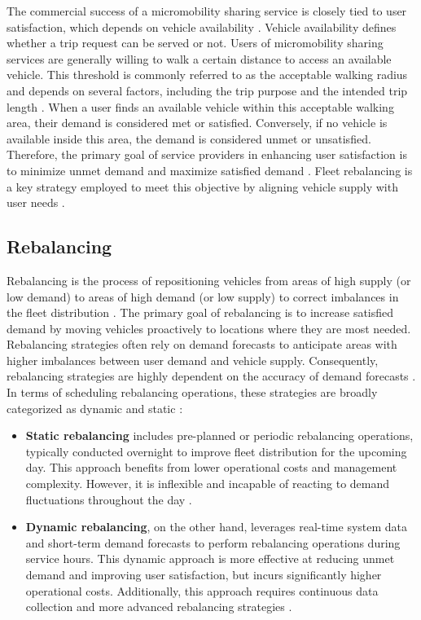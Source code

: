 The commercial success of a micromobility sharing service is closely tied to user satisfaction, which depends on vehicle availability \cite{wu_challenges_2020}.
Vehicle availability defines whether a trip request can be served or not.
Users of micromobility sharing services are generally willing to walk a certain distance to access an available vehicle.
This threshold is commonly referred to as the acceptable walking radius and depends on several factors, including the trip purpose and the intended trip length \cite{jaber_preferences_2023}.
When a user finds an available vehicle within this acceptable walking area, their demand is considered met or satisfied.
Conversely, if no vehicle is available inside this area, the demand is considered unmet or unsatisfied.
Therefore, the primary goal of service providers in enhancing user satisfaction is to minimize unmet demand and maximize satisfied demand \cite{wu_challenges_2020}.
Fleet rebalancing is a key strategy employed to meet this objective by aligning vehicle supply with user needs \cite{dellamico_bike_2014}.

\subsection{Rebalancing}\label{sec:background-mss-rebalancing}
Rebalancing is the process of repositioning vehicles from areas of high supply (or low demand) to areas of high demand (or low supply) to correct imbalances in the fleet distribution \cite{dellamico_bike_2014}.
The primary goal of rebalancing is to increase satisfied demand by moving vehicles proactively to locations where they are most needed.
Rebalancing strategies often rely on demand forecasts to anticipate areas with higher imbalances between user demand and vehicle supply.
Consequently, rebalancing strategies are highly dependent on the accuracy of demand forecasts \cite{jimenez-merono_optimization_2024}.
\\

In terms of scheduling rebalancing operations, these strategies are broadly categorized as dynamic and static \cite{wu_challenges_2020}:
\begin{itemize}
    \item \textbf{Static rebalancing} includes pre-planned or periodic rebalancing operations, typically conducted overnight to improve fleet distribution for the upcoming day.
    This approach benefits from lower operational costs and management complexity.
    However, it is inflexible and incapable of reacting to demand fluctuations throughout the day \cite{wu_challenges_2020}.
    \item \textbf{Dynamic rebalancing}, on the other hand, leverages real-time system data and short-term demand forecasts to perform rebalancing operations during service hours.
    This dynamic approach is more effective at reducing unmet demand and improving user satisfaction, but incurs significantly higher operational costs.
    Additionally, this approach requires continuous data collection and more advanced rebalancing strategies \cite{wu_challenges_2020}.
\end{itemize}

